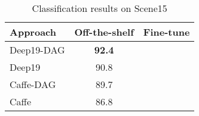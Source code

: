 \documentclass[10pt,twocolumn,letterpaper]{article}
\begin{document}
\begin{table}[htbp]
\begin{center}
\begin{tabular}{|l|c|c|}
\hline
Approach & Off-the-shelf &  Fine-tune\\
\hline
Deep19-DAG & \textbf{92.4} &  \\
Deep19~\cite{veryDeep} & 90.8 &  \\
Caffe-DAG & 89.7	& \\
Caffe~\cite{Caffe} & 86.8 & \\ \hline

\hline
\end{tabular}
\end{center}
\caption{Classification results on Scene15}
\label{table:Scene15}
\end{table}



{\small


}
\end{document}
